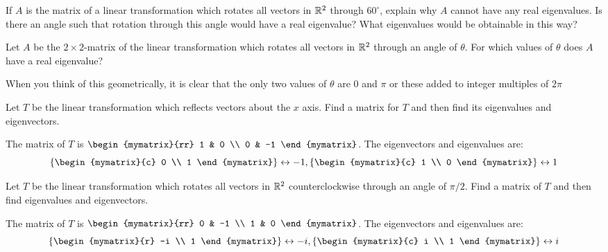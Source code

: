 \begin{enumialphparenastyle}

\begin{ex} If $A$ is the matrix of a linear transformation which rotates all
vectors in $\mathbb{R}^{2}$ through $60^{\circ }$, explain why $A$ cannot
have any real eigenvalues. Is there an angle such that rotation through this
angle would have a real eigenvalue? What eigenvalues would be obtainable in
this way? \vspace{1mm} 
\end{ex}


\begin{ex} Let $A$ be the $2\times 2$-matrix of the linear transformation which
rotates all vectors in $\mathbb{R}^{2}$ through an angle of $\theta$. For
which values of $\theta $ does $A$ have a real eigenvalue? 
\begin{sol}
When you think of this geometrically, it is clear that the only two values
of $\theta $ are 0 and $\pi $ or these added to integer multiples of $2\pi $
\end{sol}
\end{ex}


\begin{ex} Let $T$ be the linear transformation which reflects vectors about
the $x$ axis. Find a matrix for $T$ and then find its eigenvalues and
eigenvectors. 
\begin{sol}
The matrix of $T$ is $\begin{mymatrix}{rr}
1 & 0 \\
0 & -1
\end{mymatrix}$. The eigenvectors and eigenvalues are:
\[
\set{\begin{mymatrix}{c}
0 \\
1
\end{mymatrix} } \leftrightarrow -1,\set{\begin{mymatrix}{c}
1 \\
0
\end{mymatrix} } \leftrightarrow 1
\]
\end{sol}
\end{ex}

\begin{ex} Let $T$ be the linear transformation which rotates all vectors in 
$\mathbb{R}^{2}$ counterclockwise through an angle of $\pi /2$. Find a matrix
of $T$ and then find eigenvalues and eigenvectors.
\begin{sol}
The matrix of $T$ is $\begin{mymatrix}{rr}
0 & -1 \\
1 & 0
\end{mymatrix}$. The eigenvectors and eigenvalues are:
\[
\set{\begin{mymatrix}{r}
-i \\
1
\end{mymatrix} } \leftrightarrow -i,\set{\begin{mymatrix}{c}
i \\
1
\end{mymatrix} } \leftrightarrow i
\]
\end{sol}
\end{ex}


\end{enumialphparenastyle}
